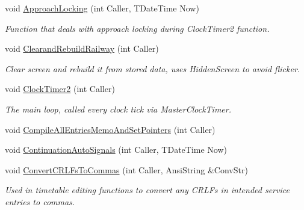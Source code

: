 \begin{DoxyCompactItemize}
\item 
\mbox{\label{class_t_interface_a0a89df44c20c9e2c096e66e2950c79a6}} 
void \mbox{\hyperlink{class_t_interface_a0a89df44c20c9e2c096e66e2950c79a6}{Approach\+Locking}} (int Caller, T\+Date\+Time Now)
\begin{DoxyCompactList}\small\item\em Function that deals with approach locking during Clock\+Timer2 function. \end{DoxyCompactList}\item 
\mbox{\label{class_t_interface_aaa05ac95703a25e1fb4863779854967c}} 
void \mbox{\hyperlink{class_t_interface_aaa05ac95703a25e1fb4863779854967c}{Clearand\+Rebuild\+Railway}} (int Caller)
\begin{DoxyCompactList}\small\item\em Clear screen and rebuild it from stored data, uses Hidden\+Screen to avoid flicker. \end{DoxyCompactList}\item 
void \mbox{\hyperlink{class_t_interface_a6139ffb52492eb89e5487a8a3cd647b5}{Clock\+Timer2}} (int Caller)
\begin{DoxyCompactList}\small\item\em The main loop, called every clock tick via Master\+Clock\+Timer. \end{DoxyCompactList}\item 
void \mbox{\hyperlink{class_t_interface_a330394a04433ce8672a52c2a0a659ff0}{Compile\+All\+Entries\+Memo\+And\+Set\+Pointers}} (int Caller)
\item 
void \mbox{\hyperlink{class_t_interface_abfdbbb1cf793f965f8c6ce60d4bb46ae}{Continuation\+Auto\+Signals}} (int Caller, T\+Date\+Time Now)
\item 
\mbox{\label{class_t_interface_a358336965e798e398258e67edbba1195}} 
void \mbox{\hyperlink{class_t_interface_a358336965e798e398258e67edbba1195}{Convert\+C\+R\+L\+Fs\+To\+Commas}} (int Caller, Ansi\+String \&Conv\+Str)
\begin{DoxyCompactList}\small\item\em Used in timetable editing functions to convert any C\+R\+L\+Fs in intended service entries to commas. \end{DoxyCompactList}\item 
\mbox{\label{class_t_interface_a7fa894f52a3cb9746e81166ec1a81bf3}} 

\end{DoxyCompactItemize}
